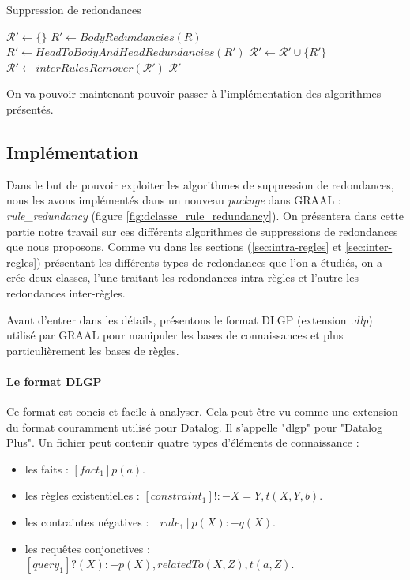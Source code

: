 \begin{algorithm}[H]\label{algo:redondances}
\caption{Suppression de redondances}
\SetAlgoLined
\DontPrintSemicolon
\SetAlgoLined
\DontPrintSemicolon
{}
    $\mathcal{R}' \gets \{\}$\; 
    {
        $R' \gets BodyRedundancies(R)$ \;
        $R' \gets HeadToBodyAndHeadRedundancies(R')$\;
        $\mathcal{R'} \gets \mathcal{R'} \cup \{R'\}$\;
    }
    $\mathcal{R'} \gets interRulesRemover(\mathcal{R'})$\;
    \Return $\mathcal{R}'$
\end{algorithm}

On va pouvoir maintenant pouvoir passer à l'implémentation des algorithmes présentés.




\subsection{Implémentation}\label{sec:conception-RAMIX}
    \par Dans le but de pouvoir exploiter les algorithmes de suppression de redondances, nous les avons implémentés dans un nouveau \textit{package} dans GRAAL : \textit{rule\_redundancy} (figure \ref{fig:dclasse_rule_redundancy}). On présentera dans cette partie notre travail sur ces différents algorithmes de suppressions de redondances que nous proposons. Comme vu dans les sections (\ref{sec:intra-regles} et \ref{sec:inter-regles}) présentant les différents types de redondances que l'on a étudiés, on a crée deux classes, l'une traitant les redondances intra-règles et l'autre les redondances inter-règles. 
    
    \par Avant d'entrer dans les détails, présentons le format DLGP (extension \textit{.dlp}) utilisé par GRAAL pour manipuler les bases de connaissances et plus particulièrement les bases de règles. 
    
    \paragraph{Le format DLGP}
         \par Ce format est concis et facile à analyser. Cela peut être vu comme une extension du format couramment utilisé pour Datalog. Il s'appelle "dlgp" pour "Datalog Plus". Un fichier peut contenir quatre types d'éléments de connaissance : 
           \begin{itemize}
             \item les faits : $[fact_1] p(a). $
              \item les règles existentielles : $[constraint_1] ! :- X=Y, t(X,Y,b).$
              \item les contraintes négatives : $[rule_1] p(X) :- q(X).$
              \item les requêtes conjonctives : $[query_1] ? (X) :- p(X), relatedTo(X,Z), t(a,Z).$
           \end{itemize}
    
